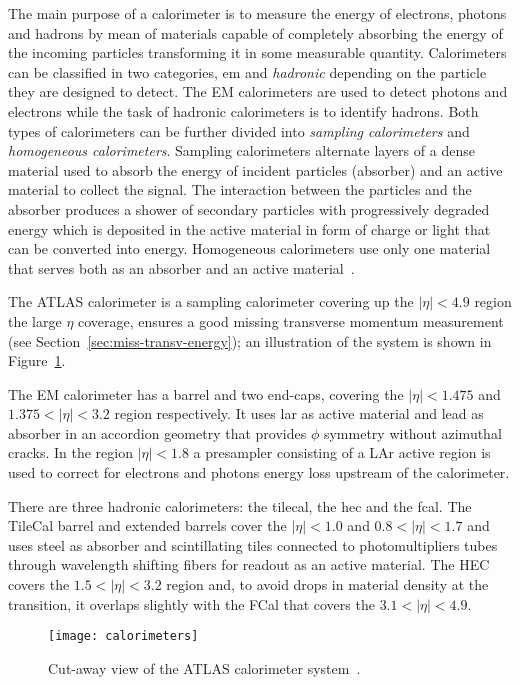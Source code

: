 The main purpose of a calorimeter is to measure the energy of electrons, photons
and hadrons by mean of materials capable of completely absorbing the energy of
the incoming particles transforming it in some measurable quantity. Calorimeters
can be classified in two categories, \gls{em} and \emph{hadronic} depending on
the particle they are designed to detect. The EM calorimeters are used to detect
photons and electrons while the task of hadronic calorimeters is to identify
hadrons. Both types of calorimeters can be further divided into \emph{sampling
  calorimeters} and \emph{homogeneous calorimeters}. Sampling calorimeters
alternate layers of a dense material used to absorb the energy of incident
particles (absorber) and an active material to collect the signal. The
interaction between the particles and the absorber produces a shower of
secondary particles with progressively degraded energy which is deposited in the
active material in form of charge or light that can be converted into
energy. Homogeneous calorimeters use only one material that serves both as an
absorber and an active material~\cite{Calorimetry}.

The ATLAS calorimeter is a sampling calorimeter covering up the $|\eta| < 4.9$
region the large $\eta$ coverage, ensures a good missing transverse momentum
measurement (see Section~\ref{sec:miss-transv-energy}); an illustration of the
system is shown in Figure~\ref{fig:calo}.

The EM calorimeter has a barrel and two end-caps, covering the $|\eta| < 1.475$
and $1.375 < |\eta| < 3.2$ region respectively. It uses \gls{lar} as active
material and lead as absorber in an accordion geometry that provides $\phi$
symmetry without azimuthal cracks. In the region $|\eta| < 1.8$ a presampler
consisting of a LAr active region is used to correct for electrons and photons
energy loss upstream of the calorimeter.

There are three hadronic calorimeters: the \gls{tilecal}, the \gls{hec} and the
\gls{fcal}. The TileCal barrel and extended barrels cover the $|\eta| < 1.0$ and
$0.8 < |\eta| < 1.7$ and uses steel as absorber and scintillating tiles
connected to photomultipliers tubes through wavelength shifting fibers for
readout as an active material. The HEC covers the $1.5 < |\eta| < 3.2$ region
and, to avoid drops in material density at the transition, it overlaps slightly
with the FCal that covers the $3.1 < |\eta| < 4.9$.

\begin{figure}[!h]
  \centering
    \texttt{[image: calorimeters]}
    \caption{Cut-away view of the ATLAS calorimeter system~\cite{ATLASPaper}.}
    \label{fig:calo}
\end{figure}

